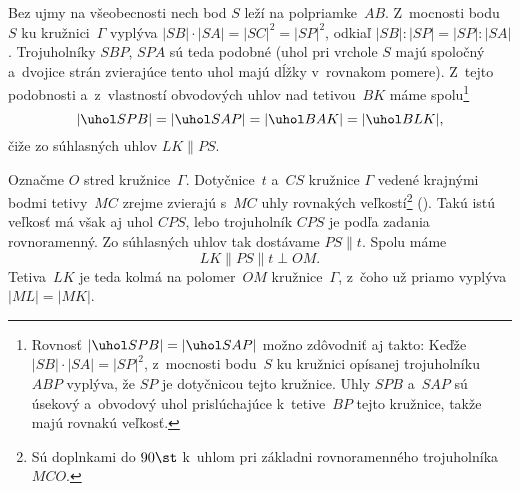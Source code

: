 {%
Bez ujmy na všeobecnosti nech bod $S$ leží na polpriamke~$AB$. Z~mocnosti bodu~$S$ ku kružnici~$\Gamma$ vyplýva $|SB|\cdot|SA|=|SC|^2=|SP|^2$, odkiaľ $|SB|:|SP|=|SP|:|SA|$. Trojuholníky $SBP$, $SPA$ sú teda podobné (uhol pri vrchole $S$ majú spoločný a~dvojice strán zvierajúce tento uhol majú dĺžky v~rovnakom pomere). Z~tejto podobnosti a~z~vlastností obvodových uhlov nad tetivou~$BK$ máme spolu\footnote{Rovnosť $|\uhol SPB|=|\uhol SAP|$ možno zdôvodniť aj takto: Keďže $|SB|\cdot|SA|=|SP|^2$, z~mocnosti bodu~$S$ ku kružnici opísanej trojuholníku $ABP$ vyplýva, že $SP$ je dotyčnicou tejto kružnice. Uhly $SPB$ a~$SAP$ sú úsekový a~obvodový uhol prislúchajúce k~tetive~$BP$ tejto kružnice, takže majú rovnakú veľkosť.}
$$
|\uhol SPB|=|\uhol SAP|=|\uhol BAK|=|\uhol BLK|,
$$
čiže zo súhlasných uhlov $LK\parallel PS$.
%

Označme $O$ stred kružnice~$\Gamma$. Dotyčnice~$t$ a~$CS$ kružnice $\Gamma$ vedené krajnými bodmi tetivy~$MC$ zrejme zvierajú s~$MC$ uhly rovnakých veľkostí\footnote{Sú doplnkami do $90\st$ k~uhlom pri základni rovnoramenného trojuholníka $MCO$.} (\obr). Takú istú veľkosť má však aj uhol $CPS$, lebo trojuholník $CPS$ je podľa zadania rovnoramenný. Zo súhlasných uhlov tak dostávame $PS\parallel t$. Spolu máme
$$
LK\parallel PS\parallel t \perp OM.
$$
Tetiva~$LK$ je teda kolmá na polomer~$OM$ kružnice~$\Gamma$, z~čoho už priamo vyplýva $|ML|=|MK|$.
}

